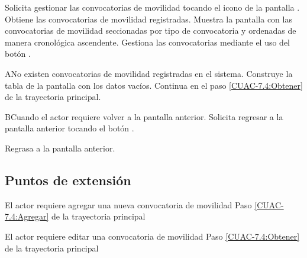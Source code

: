 	\begin{UCtrayectoria}
		\UCpaso[\UCactor] Solicita gestionar las convocatorias de movilidad tocando el icono \botMovilidad de la pantalla .
		\UCpaso [\UCsist] Obtiene las convocatorias de movilidad registradas. \label{CUAC-7.4:Obtener} 
		\UCpaso [\UCsist] Muestra la pantalla  con las convocatorias de movilidad seccionadas por tipo de convocatoria y ordenadas de manera cronológica ascendente.
		\UCpaso [\UCactor]  \label{CUAC-7.4:Agregar} Gestiona las convocatorias mediante el uso del botón . 
		
	\end{UCtrayectoria}

	\begin{UCtrayectoriaA}{A}{No existen convocatorias de movilidad registradas en el sistema.}
	\UCpaso[\UCsist] Construye la tabla de la pantalla   con los datos vacíos.
	\UCpaso[] Continua en el paso \ref{CUAC-7.4:Obtener} de la trayectoria principal.
\end{UCtrayectoriaA}
	
	\begin{UCtrayectoriaA}{B}{Cuando el actor requiere volver a la pantalla anterior.}
		\UCpaso[\UCactor] Solicita regresar a la pantalla anterior tocando el botón .
		
		\UCpaso [\UCsist] Regrasa a la pantalla anterior.
	\end{UCtrayectoriaA}
	
	\subsection{Puntos de extensión}
	
	\UCExtensionPoint
	{El actor requiere agregar una nueva convocatoria de movilidad}
	{ Paso \ref{CUAC-7.4:Agregar} de la trayectoria principal}
	{}
	
	\UCExtensionPoint
	{El actor requiere editar una convocatoria de movilidad}
	{ Paso \ref{CUAC-7.4:Obtener} de la trayectoria principal}
	{}
	